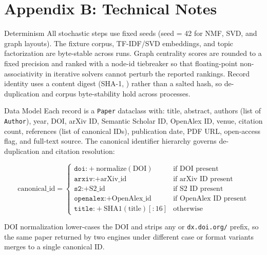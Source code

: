 \documentclass[
  ignorenonframetext,
]{beamer}
\author{\texorpdfstring{}{}}
\date{}
\begin{document}
\section{Appendix B: Technical Notes}\label{appendix-b-technical-notes}

\begin{frame}{Determinism}
\protect{}\label{determinism}
All stochastic steps use fixed seeds (seed = 42 for NMF, SVD, and graph
layouts). The fixture corpus, TF-IDF/SVD embeddings, and topic
factorization are byte-stable across runs. Graph centrality scores are
rounded to a fixed precision and ranked with a node-id tiebreaker so
that floating-point non-associativity in iterative solvers cannot
perturb the reported rankings. Record identity uses a content digest
(SHA-1, ) rather than a salted hash, so
de-duplication and corpus byte-stability hold across processes.
\end{frame}

\begin{frame}{Data Model}
\protect{}\label{data-model}
Each record is a \texttt{Paper} dataclass with: title, abstract, authors
(list of \texttt{Author}), year, DOI, arXiv ID, Semantic Scholar ID,
OpenAlex ID, venue, citation count, references (list of canonical IDs),
publication date, PDF URL, open-access flag, and full-text source. The
canonical identifier hierarchy governs de-duplication and citation
resolution:

\[
\text{canonical\_id} = \begin{cases}
\texttt{doi:} + \text{normalize}(\text{DOI}) & \text{if DOI present} \\
\texttt{arxiv:} + \text{arXiv\_id} & \text{if arXiv ID present} \\
\texttt{s2:} + \text{S2\_id} & \text{if S2 ID present} \\
\texttt{openalex:} + \text{OpenAlex\_id} & \text{if OpenAlex ID present} \\
\texttt{title:} + \text{SHA1}(\text{title})[:16] & \text{otherwise}
\end{cases}
\]

DOI normalization lower-cases the DOI and strips any
 or \texttt{dx.doi.org/} prefix, so the same
paper returned by two engines under different case or format variants
merges to a single canonical ID.
\end{frame}
\end{document}

